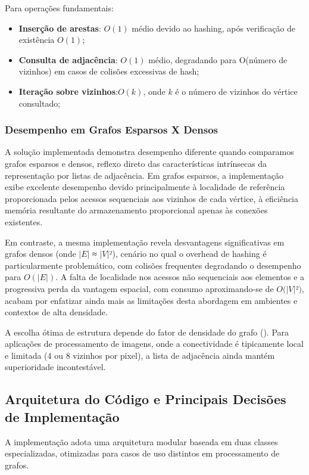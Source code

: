 \documentclass{sbc2023}%
\begin{document}
Para operações fundamentais:
\begin{itemize}
\item \textbf{Inserção de arestas}: \(O(1)\) médio devido ao hashing, após verificação de existência \(O(1)\);
\item \textbf{Consulta de adjacência}: \(O(1)\) médio, degradando para O(número de vizinhos) em casos de colisões excessivas de hash;
\item \textbf{Iteração sobre vizinhos}:\(O(k)\), onde \(k\) é o número de vizinhos do vértice consultado;
\end{itemize}

\subsubsection{Desempenho em Grafos Esparsos X Densos}

A solução implementada demonstra desempenho diferente quando comparamos grafos esparsos e densos, reflexo direto das características intrínsecas da representação por listas de adjacência. Em grafos esparsos, a implementação exibe excelente desempenho devido principalmente à localidade de referência proporcionada pelos acessos sequenciais aos vizinhos de cada vértice, à eficiência memória resultante do armazenamento proporcional apenas às conexões existentes.

Em contraste, a mesma implementação revela desvantagens significativas em grafos densos (onde \(|E|\) ≈ \(|V|\)²), cenário no qual o overhead de hashing é particularmente problemático, com colisões frequentes degradando o desempenho para \(O(|E|)\). A falta de localidade nos acessos não sequenciais aos elementos e a progressiva perda da vantagem espacial, com consumo aproximando-se de \(O(|V|\)²\()\), acabam por enfatizar ainda mais as limitações desta abordagem em ambientes e contextos de alta densidade. 

A escolha ótima de estrutura depende do fator de densidade do grafo (\cite{ref3}). Para aplicações de processamento de imagens, onde a conectividade é tipicamente local e limitada (4 ou 8 vizinhos por pixel), a lista de adjacência ainda mantém superioridade incontestável.

\subsection{Arquitetura do Código e Principais Decisões de Implementação}

A implementação adota uma arquitetura modular baseada em duas classes especializadas, otimizadas para casos de uso distintos em processamento de grafos.
\end{document}
